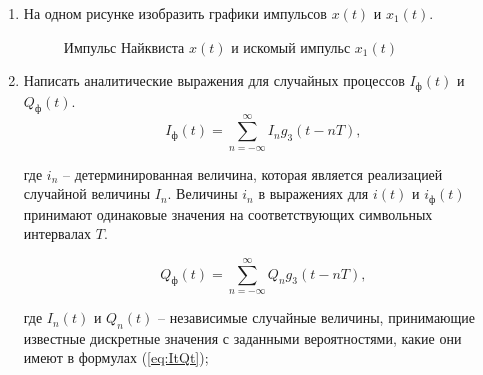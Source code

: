 \documentclass[a4paper, 12pt]{article}
\begin{document}
\begin{enumerate}
  \item На одном рисунке изобразить графики импульсов 
  $x(t)$ и $x_1(t)$.

  \begin{figure}[H]
    \centering
    \caption{Импульс Найквиста $x(t)$ и искомый импульс $x_1(t)$}
  \end{figure}
  \item Написать аналитические выражения для случайных процессов 
  $I_ф(t)$ и $Q_ф(t)$.
  \begin{equation}
    I_ф(t)=\sum^\infty_{n=-\infty}I_ng_3(t-nT), 
  \end{equation}

  где $i_n$ -- детерминированная величина, которая является 
  реализацией случайной величины $I_n$. 
  Величины $i_n$ в выражениях для $i(t)$ и $i_ф(t)$ 
  принимают одинаковые значения на соответствующих символьных 
  интервалах $T$.

  \begin{equation}
    Q_ф(t)=\sum^\infty_{n=-\infty}Q_ng_3(t-nT), 
  \end{equation}

  где $I_n(t)$ и $Q_n(t)$ -- независимые случайные величины, 
  принимающие известные дискретные значения с заданными 
  вероятностями, какие они имеют в формулах (\ref{eq:ItQt});


\end{enumerate}
\end{document}
